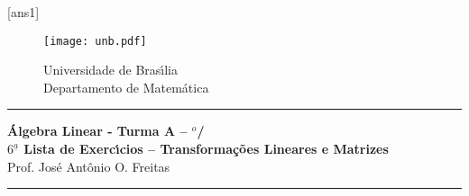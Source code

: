\documentclass[12pt]{exam}
\newcommand{\vesp}[1]{\vspace{ #1  cm}}
\begin{document}

[ans1]

\begin{figure}[h]
        \begin{minipage}[c]{1.7cm}
        \texttt{[image: unb.pdf]}
        \end{minipage}%
        \hspace{0pt}
        \begin{minipage}[c]{4in}
          {Universidade de Bras{\'\i}lia} \\
          {Departamento de Matem{\'a}tica}
\end{minipage}
\end{figure}

\vesp{-0.35} \hrule

\begin{center}
{\Large\bf \'Algebra Linear - Turma A -- \semestre$^{o}$/\ano} \\ \vspace{9pt} {\large\bf
  $6^{\underline{a}}$ Lista de Exerc{\'\i}cios -- Transforma\c{c}\~oes Lineares e Matrizes}\\ \vspace{9pt} Prof. Jos{\'e} Ant{\^o}nio O. Freitas
\end{center}
\hrule

\vesp{.6}
\end{document}
